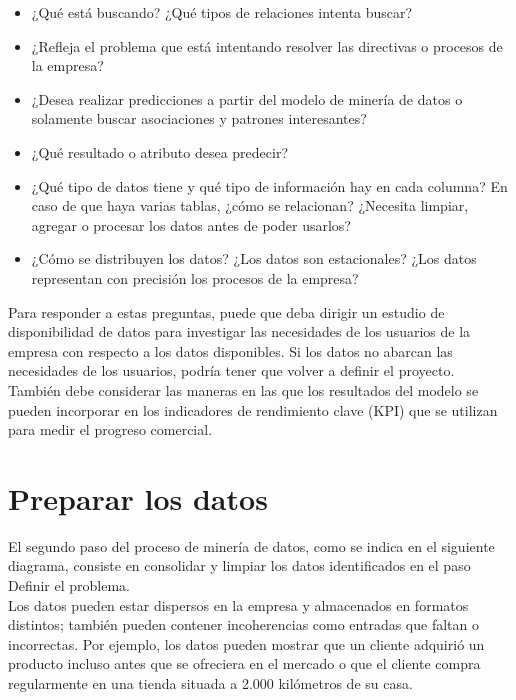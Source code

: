 \documentclass[a4paper, 11pt]{article} %
\begin{document}
\begin{itemize}
\item ¿Qué está buscando? ¿Qué tipos de relaciones intenta buscar?
\item ¿Refleja el problema que está intentando resolver las directivas o procesos de la empresa?
\item ¿Desea realizar predicciones a partir del modelo de minería de datos o solamente buscar asociaciones y patrones interesantes?
\item ¿Qué resultado o atributo desea predecir?
\item ¿Qué tipo de datos tiene y qué tipo de información hay en cada columna? En caso de que haya varias tablas, ¿cómo se relacionan? ¿Necesita limpiar, agregar o procesar los datos antes de poder usarlos?
\item ¿Cómo se distribuyen los datos? ¿Los datos son estacionales? ¿Los datos representan con precisión los procesos de la empresa?
\end{itemize}

Para responder a estas preguntas, puede que deba dirigir un estudio de disponibilidad de datos para investigar las necesidades de los usuarios de la empresa con respecto a los datos disponibles. Si los datos no abarcan las necesidades de los usuarios, podría tener que volver a definir el proyecto.\\

También debe considerar las maneras en las que los resultados del modelo se pueden incorporar en los indicadores de rendimiento clave (KPI) que se utilizan para medir el progreso comercial.

\section*{Preparar los datos}

El segundo paso del proceso de minería de datos, como se indica en el siguiente diagrama, consiste en consolidar y limpiar los datos identificados en el paso Definir el problema.\\

Los datos pueden estar dispersos en la empresa y almacenados en formatos distintos; también pueden contener incoherencias como entradas que faltan o incorrectas. Por ejemplo, los datos pueden mostrar que un cliente adquirió un producto incluso antes que se ofreciera en el mercado o que el cliente compra regularmente en una tienda situada a 2.000 kilómetros de su casa.\\
\end{document}
